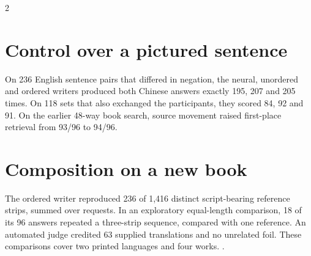 \begin{multicols}{2}
\section*{Control over a pictured sentence}
On 236 English sentence pairs that differed in negation, the neural, unordered and ordered writers produced both Chinese answers exactly 195, 207 and 205 times. On 118 sets that also exchanged the participants, they scored 84, 92 and 91. On the earlier 48-way book search, source movement raised first-place retrieval from 93/96 to 94/96.
\section*{Composition on a new book}
The ordered writer reproduced 236 of 1,416 distinct script-bearing reference strips, summed over requests. In an exploratory equal-length comparison, 18 of its 96 answers repeated a three-strip sequence, compared with one reference. An automated judge credited 63 supplied translations and no unrelated foil. These comparisons cover two printed languages and four works. .
\end{multicols}

